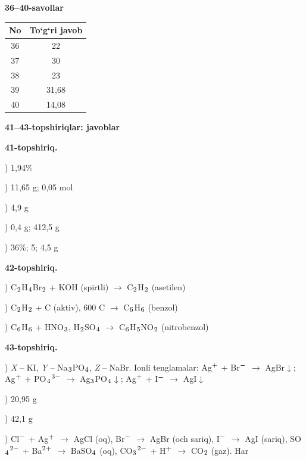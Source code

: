 \documentclass[11pt,a4paper]{article}
\renewcommand{\textsubscript}[1]{\ensuremath{_{\text{\fontsize{8}{8}\selectfont #1}}}}
\renewcommand{\textsuperscript}[1]{\ensuremath{^{\text{\fontsize{8}{8}\selectfont #1}}}}
\begin{document}
\noindent\textbf{36--40-savollar}\par\smallskip
\noindent\begin{tabular}{|c|c|}\hline \textbf{No} & \textbf{To`g`ri javob}\\\hline
36 & 22\\\hline
37 & 30\\\hline
38 & 23\\\hline
39 & 31,68\\\hline
40 & 14,08\\\hline
\end{tabular}\par\medskip
\noindent\textbf{41--43-topshiriqlar: javoblar}\par\smallskip
\noindent\textbf{41-topshiriq.}\par
{}) 1,94\%\par
{}) 11,65 g; 0,05 mol\par
{}) 4,9 g\par
{}) 0,4 g; 412,5 g\par
{}) 36\%; 5; 4,5 g\par
\noindent\textbf{42-topshiriq.}\par
{}) C\textsubscript{2}H\textsubscript{4}Br\textsubscript{2} + KOH (spirtli) $\to$ C\textsubscript{2}H\textsubscript{2} (asetilen)\par
{}) C\textsubscript{2}H\textsubscript{2} + C (aktiv), 600 \textdegree{}C $\to$ C\textsubscript{6}H\textsubscript{6} (benzol)\par
{}) C\textsubscript{6}H\textsubscript{6} + HNO\textsubscript{3}, H\textsubscript{2}SO\textsubscript{4} $\to$ C\textsubscript{6}H\textsubscript{5}NO\textsubscript{2} (nitrobenzol)\par
\noindent\textbf{43-topshiriq.}\par
{}) \textit{X} -- KI, \textit{Y} -- Na\textsubscript{3}PO\textsubscript{4}, \textit{Z} -- NaBr. Ionli tenglamalar: Ag\textsuperscript{+} + Br\textsuperscript{$-$} $\to$ AgBr$\downarrow$; Ag\textsuperscript{+} + PO\textsubscript{4}\textsuperscript{3$-$} $\to$ Ag\textsubscript{3}PO\textsubscript{4}$\downarrow$; Ag\textsuperscript{+} + I\textsuperscript{$-$} $\to$ AgI$\downarrow$\par
{}) 20,95 g\par
{}) 42,1 g\par
{}) Cl\textsuperscript{$-$} + Ag\textsuperscript{+} $\to$ AgCl (oq), Br\textsuperscript{$-$} $\to$ AgBr (och sariq), I\textsuperscript{$-$} $\to$ AgI (sariq), SO\textsubscript{4}\textsuperscript{2$-$} + Ba\textsuperscript{2+} $\to$ BaSO\textsubscript{4} (oq), CO\textsubscript{3}\textsuperscript{2$-$} + H\textsuperscript{+} $\to$ CO\textsubscript{2} (gaz). Har \par
\end{document}

